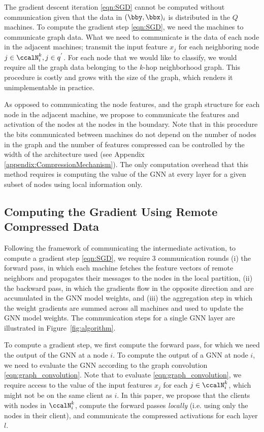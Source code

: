 \documentclass[lettersize,journal]{IEEEtran}
\begin{document}
The gradient descent iteration \eqref{eqn:SGD} cannot be computed without communication given that the data in $(\bby,\bbx)_i$ is distributed in the $Q$ machines. To compute the gradient step \eqref{eqn:SGD}, we need the machines to communicate graph data. What we need to communicate is the data of each node in the adjacent machines; transmit the input feature $x_j$ for each neighboring node $j\in \ccalN_i^k, j \in q^{'}$. For each node that we would like to classify, we would require all the graph data belonging to the $k$-hop neighborhood graph. This procedure is costly and grows with the size of the graph, which renders it unimplementable in practice. 

As opposed to communicating the node features, and the graph structure for each node in the adjacent machine, we propose to communicate the features and activation of the nodes at the nodes in the boundary. Note that in this procedure the bits communicated between machines do not depend on the number of nodes in the graph and the number of features compressed can be controlled by the width of the architecture used (see Appendix \ref{appendix:CompressionMechanism}). The only computation overhead that this method requires is computing the value of the GNN at every layer for a given subset of nodes using local information only. 

\subsection{Computing the Gradient Using Remote Compressed Data}

Following the framework of communicating the intermediate activation, to compute a gradient step \eqref{eqn:SGD}, we require $3$ communication rounds (i) the forward pass, in which each machine fetches the feature vectors of remote neighbors and propagates their messages to the nodes in the local partition, (ii) the backward pass, in which the gradients flow in the opposite direction and are accumulated in the GNN model weights, and  (iii) the aggregation step in which the weight gradients are summed across all machines and used to update the GNN model weights. The communication steps for a single GNN layer are illustrated in Figure~\ref{fig:algorithm}. 

To compute a gradient step, we first compute the forward pass, for which we need the output of the GNN at a node $i$. To compute the output of a GNN at node $i$, we need to evaluate the GNN according to the graph convolution \eqref{eqn:graph_convolution}. Note that to evaluate \eqref{eqn:graph_convolution}, we require access to the value of the input features $x_j$ for each $j\in \ccalN_i^k$, which might not be on the same client as $i$. In this paper, we propose that the clients with nodes in $\ccalN_i^k$, compute the forward passes \textit{locally} (i.e. using only the nodes in their client), and communicate the compressed activations for each layer $l$. 
\end{document}
